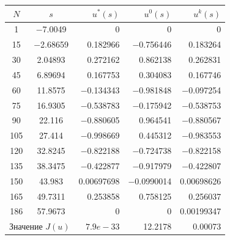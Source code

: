 \begin{center}


\begin{tabular}{|c|c|r|r|r|} \hline


$N$  & $s$       & $u^*(s)$ & $u^0(s)$ & $u^k(s)$ \\ \hline


1    & $-$7.0049   & 0           & 0           & 0 \\


15   & $-$2.68659  & 0.182966    & $-$0.756446   & 0.183264 \\


30   & 2.04893   & 0.272162    & 0.862138    & 0.262831 \\


45   & 6.89694   & 0.167753    & 0.304083    & 0.167746 \\


60   & 11.8575   & $-$0.134343   & $-$0.981848   & $-$0.097254 \\


75   & 16.9305   & $-$0.538783   & $-$0.175942   & $-$0.538753 \\


90   & 22.116    & $-$0.880605   & 0.964541    & $-$0.880567\\


105  & 27.414    & $-$0.998669   & 0.445312    & $-$0.983553 \\


120  & 32.8245   & $-$0.822188   & $-$0.724738   & $-$0.822158 \\


135  & 38.3475   & $-$0.422877   & $-$0.917979   & $-$0.422807 \\ 


150  & 43.983    & 0.00697698  & $-$0.0990014  & 0.00698626 \\


165  & 49.7311   & 0.253858    & 0.758125    & 0.256037 \\ 


186  & 57.9673   & 0           &  0          & 0.00199347\\ \hline 


\multicolumn{2}{|c|}{Значение $J(u)$}& $7.9e{-}33$ &


12.2178 & 0.00073\\ \hline


\end{tabular}


\end{center}


